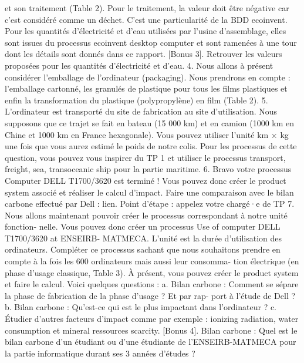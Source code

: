 \documentclass[12pt,a4paper]{article}
\begin{document}
et son traitement (Table 2). Pour le traitement, la valeur doit être négative car c’est
considéré comme un déchet. C’est une particularité de la BDD ecoinvent. Pour les
quantités d’électricité et d’eau utilisées par l’usine d’assemblage, elles sont issues du processus
ecoinvent desktop computer et sont ramenées à une tour dont les détails sont donnés dans ce
rapport.
[Bonus 3]. Retrouver les valeurs proposées pour les quantités d’électricité et d’eau.
4. Nous allons à présent considérer l’emballage de l’ordinateur (packaging). Nous prendrons en
compte : l’emballage cartonné, les granulés de plastique pour tous les films plastiques et enfin la
transformation du plastique (polypropylène) en film (Table 2).
5. L’ordinateur est transporté du site de fabrication au site d’utilisation. Nous supposons que
ce trajet se fait en bateau (15 000 km) et en camion (1000 km en Chine et 1000 km en France
hexagonale). Vous pouvez utiliser l’unité km × kg une fois que vous aurez estimé le poids de
notre colis. Pour les processus de cette question, vous pouvez vous inspirer du TP 1 et utiliser
le processus transport, freight, sea, transoceanic ship pour la partie maritime.
6. Bravo votre processus Computer DELL T1700/3620 est terminé ! Vous pouvez donc créer le
product system associé et réaliser le calcul d’impact. Faire une comparaison avec le bilan carbone
effectué par Dell : lien.
Point d’étape : appelez votre chargé·e de TP
7. Nous allons maintenant pouvoir créer le processus correspondant à notre unité fonction-
nelle. Vous pouvez donc créer un processus Use of computer DELL T1700/3620 at ENSEIRB-
MATMECA. L’unité est la durée d’utilisation des ordinateurs. Compléter ce processus sachant
que nous souhaitons prendre en compte à la fois les 600 ordinateurs mais aussi leur consomma-
tion électrique (en phase d’usage classique, Table 3). À présent, vous pouvez créer le product
system et faire le calcul. Voici quelques questions :
a. Bilan carbone : Comment se sépare la phase de fabrication de la phase d’usage ? Et par rap-
port à l’étude de Dell ?
b. Bilan carbone : Qu’est-ce qui est le plus impactant dans l’ordinateur ?
c. Étudier d’autres facteurs d’impact comme par exemple : ionizing radiation, water consumption
et mineral ressources scarcity.
[Bonus 4]. Bilan carbone : Quel est le bilan carbone d’un étudiant ou d’une étudiante de
l’ENSEIRB-MATMECA pour la partie informatique durant ses 3 années d’études ?
\end{document}
